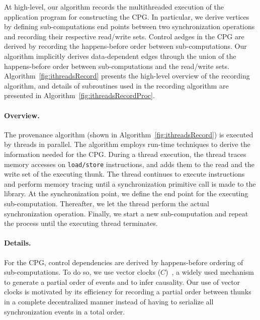  
 
At high-level, our algorithm records the multithreaded execution of the
application program for constructing the CPG.
In particular, we derive vertices  by defining
sub-computations end points between two synchronization operations and recording their respective read/write sets. Control aedges in the CPG are derived by recording the happens-before order between sub-computations. Our algorithm implicitly derives data-dependent edges through the union of the happens-before order between sub-computations and the read/write sets. Algorithm~\ref{fig:ithreadsRecord} presents the high-level
overview of the recording algorithm, and details of subroutines used in the recording algorithm are presented in Algorithm~\ref{fig:ithreadsRecordProc}.
  

\paragraph{Overview.}   The provenance algorithm (shown in Algorithm~\ref{fig:ithreadsRecord}) is executed by threads in parallel. The algorithm employs run-time techniques to derive the information needed for the CPG. During a thread execution, the thread traces memory accesses on {\tt load/store} instructions, and adds them to the read and
the write set of the executing thunk. The thread continues to execute instructions and perform memory tracing until a synchronization primitive call is made to the \pthreads  library. At the synchronization point, we define the end point for the executing sub-computation. 
Thereafter, we let the thread perform the actual synchronization operation.
Finally, we start a new sub-computation and repeat the process until the executing thread
terminates. 

 
 

\paragraph{Details.} For the CPG, control dependencies are derived by 
happens-before ordering of sub-computations. To do so, we use vector clocks
($C$)~\cite{Mattern89virtualtime},  a widely used mechanism to generate a partial order of events and to infer causality. Our use of vector
clocks is motivated by its efficiency for recording a partial order between thunks in a complete decentralized manner instead of having to serialize all synchronization events in a total order.

